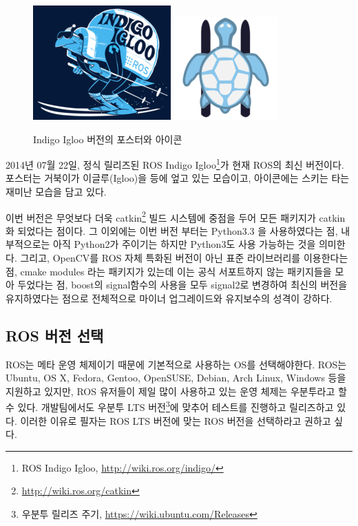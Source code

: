 \begin{figure}[h]
\centering
\includegraphics[width=0.4\columnwidth]{pictures/chapter1/indigo_igloo.png}
\includegraphics[width=0.3\columnwidth]{pictures/chapter1/indigo_igloo_icon.png}
\caption{Indigo Igloo 버전의 포스터와 아이콘}
\end{figure}

2014년 07월 22일, 정식 릴리즈된 ROS Indigo Igloo\footnote{ROS Indigo Igloo, \url{http://wiki.ros.org/indigo/}}가 현재 ROS의 최신 버전이다. 포스터는 거북이가 이글루(Igloo)을 등에 엎고 있는 모습이고, 아이콘에는 스키는 타는 재미난 모습을 담고 있다.

이번 버전은 무엇보다 더욱 catkin\footnote{\url{http://wiki.ros.org/catkin}} 빌드 시스템에 중점을 두어 모든 패키지가 catkin화 되었다는 점이다. 그 이외에는 이번 버전 부터는 Python3.3 을 사용하였다는 점, 내부적으로는 아직 Python2가 주이기는 하지만 Python3도 사용 가능하는 것을 의미한다. 그리고, OpenCV를 ROS 자체 특화된 버전이 아닌 표준 라이브러리를 이용한다는 점, cmake modules 라는 패키지가 있는데 이는 공식 서포트하지 않는 패키지들을 모아 두었다는 점, boost의 signal함수의 사용을 모두 signal2로 변경하여 최신의 버전을 유지하였다는 점으로 전체적으로 마이너 업그레이드와 유지보수의 성격이 강하다.

\subsection{ROS 버전 선택}

ROS는 메타 운영 체제이기 때문에 기본적으로 사용하는 OS를 선택해야한다. ROS는 Ubuntu, OS X, Fedora, Gentoo, OpenSUSE, Debian, Arch Linux, Windows 등을 지원하고 있지만, ROS 유저들이 제일 많이 사용하고 있는 운영 체제는 우분투라고 할 수 있다. 개발팀에서도 우분투 LTS 버전\footnote{우분투 릴리즈 주기, \url{https://wiki.ubuntu.com/Releases}}에 맞추어 테스트를 진행하고 릴리즈하고 있다. 이러한 이유로 필자는 ROS LTS 버전에 맞는 ROS 버전을 선택하라고 권하고 싶다. 

